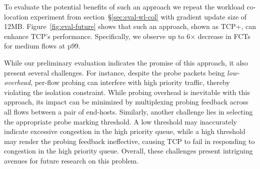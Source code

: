 To evaluate the potential benefits of such an approach we repeat the workload co-location experiment from section~\S\ref{sec:eval-wl-col} with gradient update size of 12MB. Figure~\ref{fig:eval-future} shows that such an approach, shown as TCP+, can enhance TCP's performance. Specifically, we observe up to 6$\times$ decrease in FCTs for medium flows at p99. 

While our preliminary evaluation indicates the promise of this approach, it also present several challenges. For instance, despite the probe packets being \emph{low-overhead}, per-flow probing can interfere with high priority traffic, thereby violating the isolation constraint. While probing overhead is inevitable with this approach, its impact can be minimized by multiplexing probing feedback across all flows between a pair of end-hosts.
Similarly, another challenge lies in selecting the appropriate probe marking threshold. A low threshold may inaccurately indicate excessive congestion in the high priority queue, while a high threshold may render the probing feedback ineffective, causing TCP to fail in responding to congestion in the high priority queue. 
Overall, these challenges present intriguing avenues for future research on this problem.